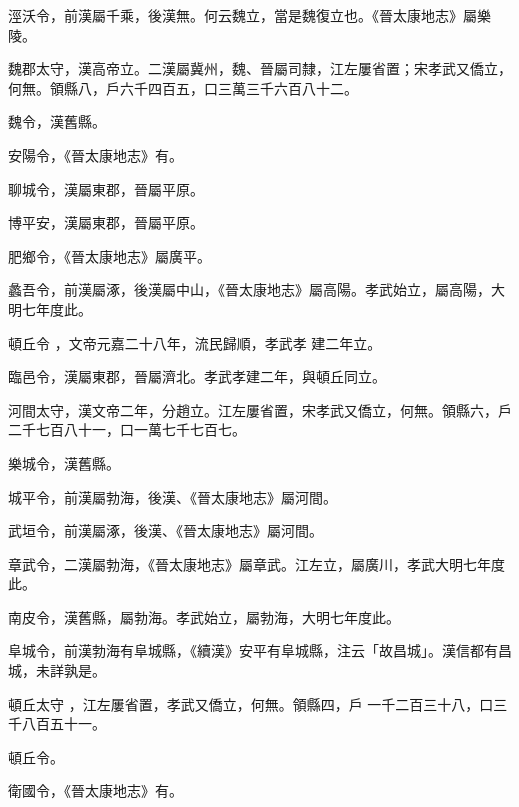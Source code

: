 \begin{pinyinscope}
 涇沃令，前漢屬千乘，後漢無。何云魏立，當是魏復立也。《晉太康地志》屬樂陵。



 魏郡太守，漢高帝立。二漢屬冀州，魏、晉屬司隸，江左屢省置；宋孝武又僑立，何無。領縣八，戶六千四百五，口三萬三千六百八十二。



 魏令，漢舊縣。



 安陽令，《晉太康地志》有。



 聊城令，漢屬東郡，晉屬平原。



 博平安，漢屬東郡，晉屬平原。



 肥鄉令，《晉太康地志》屬廣平。



 蠡吾令，前漢屬涿，後漢屬中山，《晉太康地志》屬高陽。孝武始立，屬高陽，大明七年度此。


頓丘令
 ，文帝元嘉二十八年，流民歸順，孝武孝
 建二年立。



 臨邑令，漢屬東郡，晉屬濟北。孝武孝建二年，與頓丘同立。



 河間太守，漢文帝二年，分趙立。江左屢省置，宋孝武又僑立，何無。領縣六，戶二千七百八十一，口一萬七千七百七。



 樂城令，漢舊縣。



 城平令，前漢屬勃海，後漢、《晉太康地志》屬河間。



 武垣令，前漢屬涿，後漢、《晉太康地志》屬河間。



 章武令，二漢屬勃海，《晉太康地志》屬章武。江左立，屬廣川，孝武大明七年度此。



 南皮令，漢舊縣，屬勃海。孝武始立，屬勃海，大明七年度此。



 阜城令，前漢勃海有阜城縣，《續漢》安平有阜城縣，注云「故昌城」。漢信都有昌城，未詳孰是。


頓丘太守
 ，江左屢省置，孝武又僑立，何無。領縣四，戶
 一千二百三十八，口三千八百五十一。


頓丘令。



 衛國令，《晉太康地志》有。




\end{pinyinscope}
